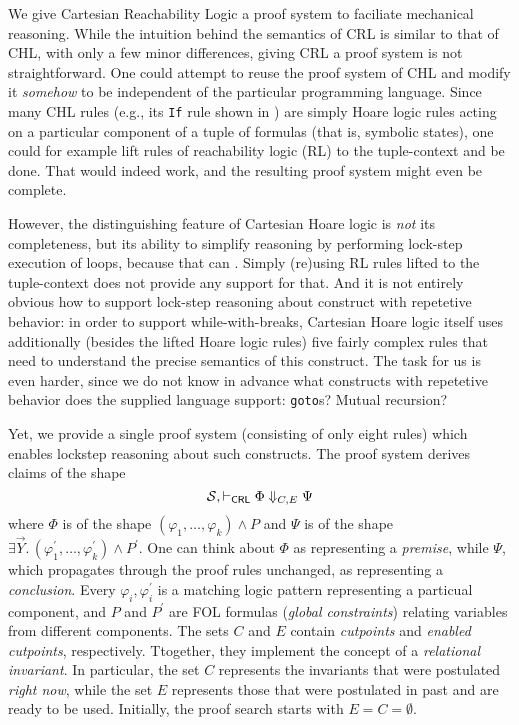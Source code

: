 We give Cartesian Reachability Logic a proof system to faciliate mechanical reasoning.
While the intuition behind the semantics of CRL is similar to that of CHL, with only a few minor differences,
giving CRL a proof system is not straightforward.
One could attempt to reuse the proof system of CHL and modify it \emph{somehow} to be independent
of the particular programming language.
Since many CHL rules (e.g., its \texttt{If} rule shown in ) are simply Hoare logic rules acting on a particular component of
a tuple of formulas (that is, symbolic states),
one could for example lift rules of reachability logic (RL) to the tuple-context and be done.
That would indeed work, and the resulting proof system might even be complete.

However, the distinguishing feature of Cartesian Hoare logic is \emph{not} its completeness,
but its ability to simplify reasoning by performing lock-step execution of loops,
because that can .
Simply (re)using RL rules lifted to the tuple-context does not provide any support for that.
And it is not entirely obvious how to support lock-step reasoning about construct with repetetive behavior:
in order to support while-with-breaks, Cartesian Hoare logic itself uses additionally (besides the lifted Hoare logic rules)
five fairly complex rules that need to understand the precise semantics of this construct.
The task for us is even harder, since we do not know in advance what constructs with repetetive behavior does
the supplied language support: \texttt{goto}s? Mutual recursion? 

Yet, we provide a single proof system (consisting of only eight rules) which enables lockstep reasoning about such constructs.
The proof system derives claims of the shape
\begin{equation*}
\mathcal{S}, \vdash_{\mathsf{CRL}} \Phi \Downarrow_{C,E} \Psi
\end{equation*}
where $\Phi$ is of the shape
$(\varphi_1, \ldots, \varphi_k) \land P$
and $\Psi$ is of the shape
$\exists \vec{Y}.\, (\varphi^\prime_1, \ldots, \varphi^\prime_k) \land P^\prime$.
One can think about $\Phi$ as representing a \emph{premise}, while $\Psi$, which propagates through
the proof rules unchanged, as representing a \emph{conclusion}.
Every $\varphi_i, \varphi^\prime_i$ is a matching logic pattern representing a particual component,
and $P$ and $P^\prime$ are FOL formulas (\emph{global constraints}) relating variables from different components.
The sets $C$ and $E$ contain \emph{cutpoints} and \emph{enabled cutpoints}, respectively.
Ttogether, they implement the concept of a \emph{relational invariant}.
In particular, the set $C$ represents the invariants that were postulated \emph{right now},
while the set $E$ represents those that were postulated in past and are ready to be used.
Initially, the proof search starts with $E = C = \emptyset$.


